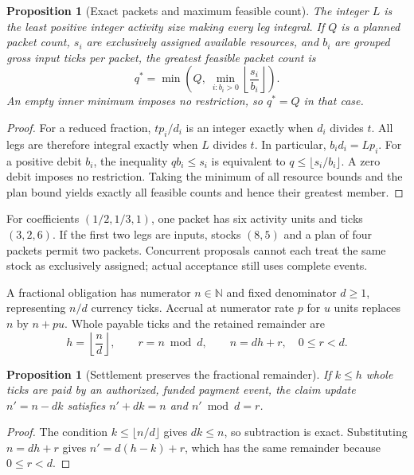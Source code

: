 \documentclass[11pt,a4paper]{article}
\newtheorem{proposition}[theorem]{Proposition}
\begin{document}
\begin{proposition}[Exact packets and maximum feasible count]
The integer $L$ is the least positive integer activity size making every leg integral. If $Q$ is a planned packet count, $s_i$ are exclusively assigned available resources, and $b_i$ are grouped gross input ticks per packet, the greatest feasible packet count is
\begin{equation}
q^*=\min\left(Q,\ \min_{i:b_i>0}\left\lfloor\frac{s_i}{b_i}\right\rfloor\right).
\end{equation}
An empty inner minimum imposes no restriction, so $q^*=Q$ in that case.
\end{proposition}
\begin{proof}
For a reduced fraction, $tp_i/d_i$ is an integer exactly when $d_i$ divides $t$. All legs are therefore integral exactly when $L$ divides $t$. In particular, $b_i d_i=Lp_i$. For a positive debit $b_i$, the inequality $qb_i\leq s_i$ is equivalent to $q\leq\lfloor s_i/b_i\rfloor$. A zero debit imposes no restriction. Taking the minimum of all resource bounds and the plan bound yields exactly all feasible counts and hence their greatest member.
\end{proof}

For coefficients $(1/2,1/3,1)$, one packet has six activity units and ticks $(3,2,6)$. If the first two legs are inputs, stocks $(8,5)$ and a plan of four packets permit two packets. Concurrent proposals cannot each treat the same stock as exclusively assigned; actual acceptance still uses complete events.

A fractional obligation has numerator $n\in\mathbb N$ and fixed denominator $d\geq1$, representing $n/d$ currency ticks. Accrual at numerator rate $p$ for $u$ units replaces $n$ by $n+pu$. Whole payable ticks and the retained remainder are
\begin{equation}
h=\left\lfloor\frac nd\right\rfloor,\qquad r=n\bmod d,\qquad n=dh+r,\quad 0\leq r<d.
\end{equation}

\begin{proposition}[Settlement preserves the fractional remainder]
If $k\leq h$ whole ticks are paid by an authorized, funded payment event, the claim update $n'=n-dk$ satisfies $n'+dk=n$ and $n'\bmod d=r$.
\end{proposition}
\begin{proof}
The condition $k\leq\lfloor n/d\rfloor$ gives $dk\leq n$, so subtraction is exact. Substituting $n=dh+r$ gives $n'=d(h-k)+r$, which has the same remainder because $0\leq r<d$.
\end{proof}
\end{document}
